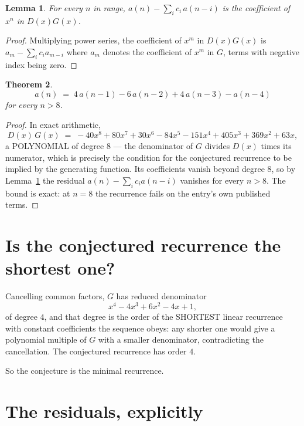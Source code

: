 \documentclass[11pt,a4paper]{article}
\theoremstyle{plain}
\newtheorem{theorem}{Theorem}
\newtheorem{lemma}[theorem]{Lemma}
\theoremstyle{definition}
\begin{document}
\begin{lemma}\label{lem:key}
For every $n$ in range, $a(n)-\sum_i c_i\,a(n-i)$ is the coefficient of $x^{n}$ in
$D(x)G(x)$.
\end{lemma}

\begin{proof}
Multiplying power series, the coefficient of $x^{m}$ in $D(x)G(x)$ is
$a_m-\sum_i c_i a_{m-i}$ where $a_m$ denotes the coefficient of $x^{m}$ in $G$, terms with
negative index being zero.
\end{proof}

\begin{theorem}
\[
a(n)\;=\;4\,a(n-1) - 6\,a(n-2) + 4\,a(n-3) - a(n-4)
\]
for every $n>8$.
\end{theorem}

\begin{proof}
In exact arithmetic,
\[
D(x)\,G(x)\;=\;- 40 x^{8} + 80 x^{7} + 30 x^{6} - 84 x^{5} - 151 x^{4} + 405 x^{3} + 369 x^{2} + 63 x,
\]
a POLYNOMIAL of degree $8$ --- the denominator of $G$ divides $D(x)$ times its numerator,
which is precisely the condition for the conjectured recurrence to be implied by the
generating function. Its coefficients vanish beyond degree $8$, so by
Lemma~\ref{lem:key} the residual $a(n)-\sum_ic_ia(n-i)$ vanishes for every
$n>8$. The bound is exact: at $n=8$ the recurrence fails on the entry's own published terms.
\end{proof}

\section{Is the conjectured recurrence the shortest one?}

Cancelling common factors, $G$ has reduced denominator
\[
x^{4} - 4 x^{3} + 6 x^{2} - 4 x + 1,
\]
of degree $4$, and that degree is the order of the SHORTEST linear recurrence with
constant coefficients the sequence obeys: any shorter one would give a polynomial multiple of
$G$ with a smaller denominator, contradicting the cancellation. The conjectured recurrence has
order $4$.

So the conjecture is the minimal recurrence.

\section{The residuals, explicitly}
\end{document}
